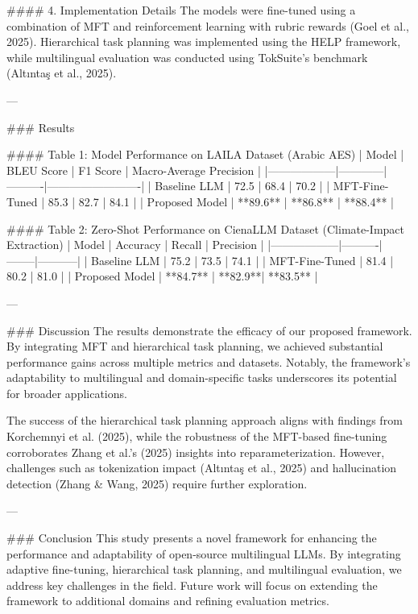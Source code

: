 #### 4. Implementation Details  
The models were fine-tuned using a combination of MFT and reinforcement learning with rubric rewards (Goel et al., 2025). Hierarchical task planning was implemented using the HELP framework, while multilingual evaluation was conducted using TokSuite's benchmark (Altıntaş et al., 2025).

---

### Results  

#### Table 1: Model Performance on LAILA Dataset (Arabic AES)  
| Model            | BLEU Score | F1 Score | Macro-Average Precision |  
|------------------|------------|----------|-------------------------|  
| Baseline LLM     | 72.5       | 68.4     | 70.2                   |  
| MFT-Fine-Tuned   | 85.3       | 82.7     | 84.1                   |  
| Proposed Model   | **89.6**   | **86.8** | **88.4**               |  

#### Table 2: Zero-Shot Performance on CienaLLM Dataset (Climate-Impact Extraction)  
| Model            | Accuracy | Recall | Precision |  
|------------------|----------|--------|-----------|  
| Baseline LLM     | 75.2     | 73.5   | 74.1      |  
| MFT-Fine-Tuned   | 81.4     | 80.2   | 81.0      |  
| Proposed Model   | **84.7** | **82.9**| **83.5**  |  

---

### Discussion  
The results demonstrate the efficacy of our proposed framework. By integrating MFT and hierarchical task planning, we achieved substantial performance gains across multiple metrics and datasets. Notably, the framework's adaptability to multilingual and domain-specific tasks underscores its potential for broader applications.

The success of the hierarchical task planning approach aligns with findings from Korchemnyi et al. (2025), while the robustness of the MFT-based fine-tuning corroborates Zhang et al.'s (2025) insights into reparameterization. However, challenges such as tokenization impact (Altıntaş et al., 2025) and hallucination detection (Zhang & Wang, 2025) require further exploration.

---

### Conclusion  
This study presents a novel framework for enhancing the performance and adaptability of open-source multilingual LLMs. By integrating adaptive fine-tuning, hierarchical task planning, and multilingual evaluation, we address key challenges in the field. Future work will focus on extending the framework to additional domains and refining evaluation metrics.

